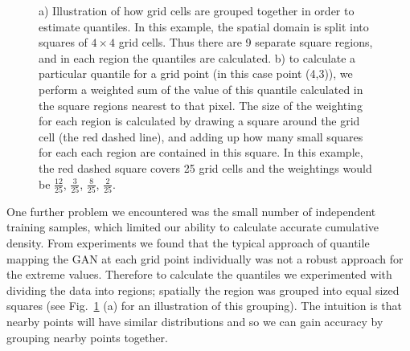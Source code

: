 \documentclass{article}
\begin{document}
\begin{figure}[h]
      \caption{a) Illustration of how grid cells are grouped together in order to estimate quantiles. In this example, the spatial domain is split into squares of $4 \times 4$ grid cells. Thus there are 9 separate square regions, and in each region the quantiles are calculated. b) to calculate a particular quantile for a grid point (in this case point (4,3)), we perform a weighted sum of the value of this quantile calculated in the square regions nearest to that pixel. The size of the weighting for each region is calculated by drawing a square around the grid cell (the red dashed line), and adding up how many small squares for each each region are contained in this square. In this example, the red dashed square covers 25 grid cells and the weightings would be $\frac{12}{25}$, $\frac{3}{25}$, $\frac{8}{25}$, $\frac{2}{25}$.}
     \label{fig:quantiles}
\end{figure}    


One further problem we encountered was the small number of independent training samples, which limited our ability to calculate accurate cumulative density. From experiments we found that the typical approach of quantile mapping the GAN at each grid point individually was not a robust approach for the extreme values. Therefore to calculate the quantiles we experimented with dividing the data into regions; spatially the region was grouped into equal sized squares (see Fig.~\ref{fig:quantiles} (a) for an illustration of this grouping). The intuition is that nearby points will have similar distributions and so we can gain accuracy by grouping nearby points together. 
\end{document}
